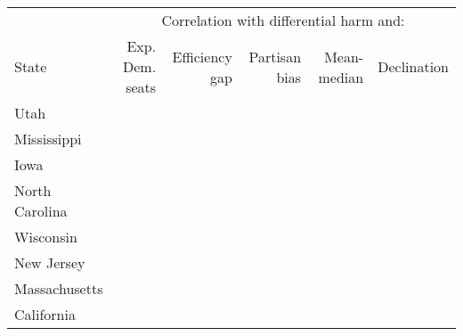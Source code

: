 
\begin{tabular}[t]{l>{}r>{}r>{}r>{}r>{}r}
\toprule
\multicolumn{1}{c}{ } & \multicolumn{5}{c}{Correlation with differential harm and:} \\
\cmidrule(l{3pt}r{3pt}){2-6}
State & Exp. Dem. seats & Efficiency gap & Partisan bias & Mean-median & Declination\\
\midrule
Utah & \cellcolor[HTML]{8A671F}{-0.983} & \cellcolor[HTML]{75689E}{0.957} & \cellcolor[HTML]{927421}{-0.893} & \cellcolor[HTML]{8E6C20}{-0.945} & \cellcolor[HTML]{947722}{-0.876}\\
Mississippi & \cellcolor[HTML]{9D8627}{-0.772} & \cellcolor[HTML]{BFD9D5}{0.207} & \cellcolor[HTML]{E8EEE3}{0.031} & \cellcolor[HTML]{E7E5C0}{-0.096} & \cellcolor[HTML]{A89735}{-0.656}\\
Iowa & \cellcolor[HTML]{AD9F3D}{-0.597} & \cellcolor[HTML]{A0B5C2}{0.449} & \cellcolor[HTML]{DED99D}{-0.185} & \cellcolor[HTML]{C4DCD7}{0.184} & \cellcolor[HTML]{A9C2C9}{0.365}\\
North Carolina & \cellcolor[HTML]{8E6C20}{-0.943} & \cellcolor[HTML]{8A88AE}{0.740} & \cellcolor[HTML]{9AAABC}{0.520} & \cellcolor[HTML]{8C8DB0}{0.704} & \cellcolor[HTML]{9BAABC}{0.519}\\
Wisconsin & \cellcolor[HTML]{998024}{-0.816} & \cellcolor[HTML]{929BB4}{0.621} & \cellcolor[HTML]{C2DBD7}{0.191} & \cellcolor[HTML]{9096B2}{0.652} & \cellcolor[HTML]{A8C1C8}{0.374}\\
New Jersey & \cellcolor[HTML]{9B8425}{-0.789} & \cellcolor[HTML]{9FB4C1}{0.459} & \cellcolor[HTML]{DCE8DF}{0.082} & \cellcolor[HTML]{EEF0E0}{-0.014} & \cellcolor[HTML]{A7C0C7}{0.381}\\
Massachusetts & \cellcolor[HTML]{987E23}{-0.826} & \cellcolor[HTML]{E9E9CA}{-0.069} & \cellcolor[HTML]{E1DDA7}{-0.158} & \cellcolor[HTML]{CADFD9}{0.159} & \cellcolor[HTML]{808080}{NA}\\
California & \cellcolor[HTML]{AEA03E}{-0.590} & \cellcolor[HTML]{939BB4}{0.616} & \cellcolor[HTML]{DCD798}{-0.199} & \cellcolor[HTML]{D1C97B}{-0.302} & \cellcolor[HTML]{AAC3C9}{0.359}\\
\bottomrule
\end{tabular}
